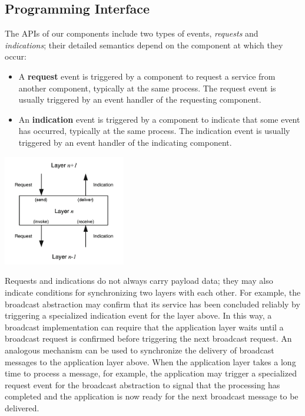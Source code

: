 \documentclass{book}
\begin{document}
\subsection{Programming Interface}
The APIs of our components include two types of events, \textit{requests} and \textit{indications};
their detailed semantics depend on the component at which they occur:
\begin{itemize}
    \item A \textbf{request} event is triggered by a component to request a service from another component, typically at the same process. 
    The request event is usually triggered by an event handler of the requesting component.
    \item An \textbf{indication} event is triggered by a component to indicate that some event has occurred, typically at the same process. 
    The indication event is usually triggered by an event handler of the indicating component.
\end{itemize}

\begin{center}
    \includegraphics[width=0.4\textwidth]{Immagini/6.png}
\end{center}

Requests and indications do not always carry payload data; they may also indicate
conditions for synchronizing two layers with each other.
For example, the broadcast abstraction may confirm that its service has been concluded reliably by triggering a specialized indication event for the layer above. 
In this way, a broadcast implementation can require that the application layer waits until a broadcast request is confirmed before triggering the next broadcast request.
An analogous mechanism can be used to synchronize the delivery of broadcast messages to the application layer above.
When the application layer takes a long time to process a message, for example, the application may trigger a specialized request event for the broadcast abstraction to signal that the processing has completed and the application is now ready for the next broadcast message to be delivered.
\end{document}
